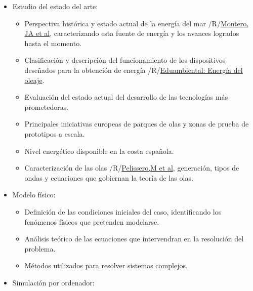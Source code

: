\begin{itemize}
\item
  Estudio del estado del arte:

  \begin{itemize}
  \item
    Perspectiva histórica y estado actual de la energía del mar
    /R/\href{Montero\%20Sousa,\%20JA\%20y\%20Calvo\%20Rolle,\%20JL;\%20\%22Energía\%20mareomotriz:\%20perspectiva\%20histórica\%20y\%20estado\%20actual\%22;\%20Técnica\%20Industrial;\%20301;\%20marzo2013;\%20pp54-60}{Montero,
    JA et al}, caracterizando esta fuente de energía y los avances
    logrados hasta el momento.
  \item
    Clasificación y descripción del funcionamiento de los dispositivos
    deseñados para la obtención de energía
    /R/\href{\%22Energía\%20del\%20oleaje\%22;\%20Eduambiental;\%20pp\%20515-550.\%20http://comunidad.eduambiental.org/file.php/1/curso/contenidos/docpdf/capitulo22.pdf}{Eduambiental:
    Energía del oleaje}.
  \item
    Evaluación del estado actual del desarrollo de las tecnologías más
    prometedoras.
  \item
    Principales iniciativas europeas de parques de olas y zonas de
    prueba de prototipos a escala.
  \item
    Nivel energético disponible en la costa española.
  \item
    Caracterización de las olas
    /R/\href{Pelissero,\%20M\%20et\%20al.;\%20\%22Aprovechamiento\%20de\%20la\%20Energía\%20Undimotriz\%22;\%20Proyecciones,\%20Vol\%209\%20No.\%202,\%20octubre\%202011;\%20pp\%2053-65}{Pelissero,M
    et al}, generación, tipos de ondas y ecuaciones que gobiernan la
    teoría de las olas.
  \end{itemize}
\item
  Modelo físico:

  \begin{itemize}
  \item
    Definición de las condiciones iniciales del caso, identificando los
    fenómenos físicos que pretenden modelarse.
  \item
    Análisis teórico de las ecuaciones que intervendran en la resolución
    del problema.
  \item
    Métodos utilizados para resolver sistemas complejos.
  \end{itemize}
\item
  Simulación por ordenador:


\end{itemize}

